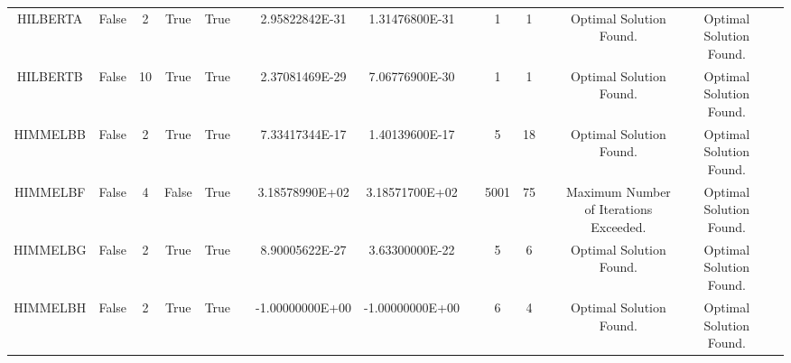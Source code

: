 \begin{longtable}{ccccccccccccccc}
	\cellcolor{default2} HILBERTA& \cellcolor{default2} False& \cellcolor{default2} 2& \cellcolor{default2} True& \cellcolor{default2} True& \cellcolor{header} & \cellcolor{ok} 2.95822842E-31& \cellcolor{best} 1.31476800E-31& \cellcolor{header} & \cellcolor{best} 1& \cellcolor{best} 1& \cellcolor{header} & \cellcolor{default2} Optimal Solution Found.& \cellcolor{default2} Optimal Solution Found.& \cellcolor{header} \\
	\cellcolor{default1} HILBERTB& \cellcolor{default1} False& \cellcolor{default1} 10& \cellcolor{default1} True& \cellcolor{default1} True& \cellcolor{header} & \cellcolor{ok} 2.37081469E-29& \cellcolor{best} 7.06776900E-30& \cellcolor{header} & \cellcolor{best} 1& \cellcolor{best} 1& \cellcolor{header} & \cellcolor{default1} Optimal Solution Found.& \cellcolor{default1} Optimal Solution Found.& \cellcolor{header} \\
	\cellcolor{default2} HIMMELBB& \cellcolor{default2} False& \cellcolor{default2} 2& \cellcolor{default2} True& \cellcolor{default2} True& \cellcolor{header} & \cellcolor{ok} 7.33417344E-17& \cellcolor{best} 1.40139600E-17& \cellcolor{header} & \cellcolor{best} 5& \cellcolor{poor} 18& \cellcolor{header} & \cellcolor{default2} Optimal Solution Found.& \cellcolor{default2} Optimal Solution Found.& \cellcolor{header} \\
	\cellcolor{default1} HIMMELBF& \cellcolor{default1} False& \cellcolor{default1} 4& \cellcolor{default1} False& \cellcolor{default1} True& \cellcolor{header} & \cellcolor{ok} 3.18578990E+02& \cellcolor{best} 3.18571700E+02& \cellcolor{header} & \cellcolor{poor} 5001& \cellcolor{best} 75& \cellcolor{header} & \cellcolor{default1} Maximum Number of Iterations Exceeded.& \cellcolor{default1} Optimal Solution Found.& \cellcolor{header} \\
	\cellcolor{default2} HIMMELBG& \cellcolor{default2} False& \cellcolor{default2} 2& \cellcolor{default2} True& \cellcolor{default2} True& \cellcolor{header} & \cellcolor{best} 8.90005622E-27& \cellcolor{ok} 3.63300000E-22& \cellcolor{header} & \cellcolor{best} 5& \cellcolor{ok} 6& \cellcolor{header} & \cellcolor{default2} Optimal Solution Found.& \cellcolor{default2} Optimal Solution Found.& \cellcolor{header} \\
	\cellcolor{default1} HIMMELBH& \cellcolor{default1} False& \cellcolor{default1} 2& \cellcolor{default1} True& \cellcolor{default1} True& \cellcolor{header} & \cellcolor{best} -1.00000000E+00& \cellcolor{best} -1.00000000E+00& \cellcolor{header} & \cellcolor{ok} 6& \cellcolor{best} 4& \cellcolor{header} & \cellcolor{default1} Optimal Solution Found.& \cellcolor{default1} Optimal Solution Found.& \cellcolor{header} \\

\end{longtable}
